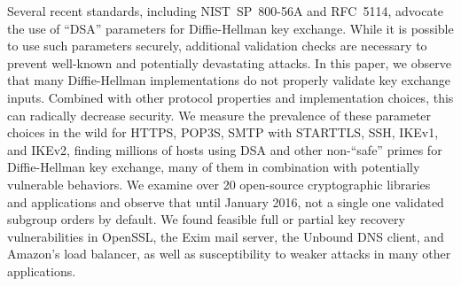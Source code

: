 \newcommand{\SubgroupPaper}{papers/subgroup/paper}
\newcommand{\SubgroupFigures}{papers/subgroup/figures}

Several recent standards, including NIST~SP~800-56A and RFC~5114, advocate the
use of ``DSA'' parameters for Diffie-Hellman key exchange.  While it is
possible to use such parameters securely, additional validation checks are
necessary to prevent well-known and potentially devastating attacks.  In this
paper, we observe that many Diffie-Hellman implementations do not properly
validate key exchange inputs. Combined with other protocol properties and
implementation choices, this can radically decrease security.
We measure the prevalence of these parameter choices in the wild
for HTTPS, POP3S, SMTP with STARTTLS, SSH, IKEv1, and IKEv2, finding millions
of hosts using DSA and other non-``safe'' primes for Diffie-Hellman key
exchange, many of them in combination with potentially vulnerable behaviors.
We examine over 20 open-source cryptographic libraries and applications and
observe that until January 2016, not a single one validated subgroup orders by
default.  We found feasible full or partial key recovery vulnerabilities in
OpenSSL, the Exim mail server, the Unbound DNS client, and Amazon's load
balancer, as well as susceptibility to weaker attacks in many other applications.







%










